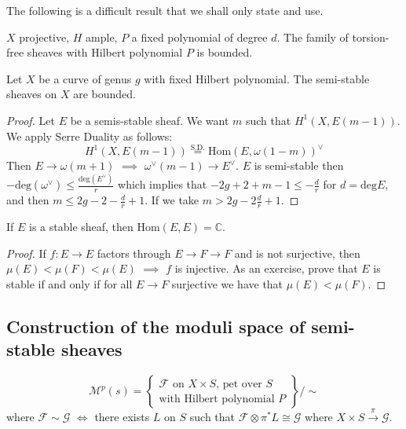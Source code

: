 The following is a difficult result that we shall only state and use.

\begin{theorem}
\label{theorem-}
$X$ projective, $H$ ample, $P$ a fixed polynomial of degree $d$. The family of
torsion-free sheaves with Hilbert polynomial $P$ is bounded.
\end{theorem}

\begin{proposition}
\label{proposition-semi-stable-sheaves-are-bounded-on-curves}
Let $X$ be a curve of genus $g$ with fixed Hilbert polynomial. The semi-stable
sheaves on $X$ are bounded.
\end{proposition}

\begin{proof}
Let $E$ be a semis-stable sheaf. We want $m$ such that $H^{1}(X,E(m-1))$. We
apply Serre Duality as follows:
$$
H^{1}(X,E(m-1))\overset{\text{S.D.}}{=}\text{Hom}(E,\omega(1-m))^\vee
$$Then $E \to \omega(m+1)$ $\implies$ $\omega^\vee(m-1)\to E^\vee$. $E$ is
semi-stable then $-\text{deg}(\omega^\vee)\leq \frac{\text{deg}(E^\vee)}{r}$
which implies that $-2g+2+m-1\leq -\frac{d}{r}$ for $d=\text{deg}E$, and then
$m\leq  2g-2-\frac{d}{r}+1$. If we take $m>2g-2\frac{d}{r}+1$.
\end{proof}

\begin{proposition}
\label{proposition-}
If  $E$ is a stable sheaf, then $\text{Hom}(E,E)=\mathbb{C}$.
\end{proposition}

\begin{proof}
If $f:E \to E$ factors through $E \to F \to F$ and is not surjective, then
$\mu(E)<\mu(F)<\mu(E)$ $\implies$ $f$ is injective. As an exercise, prove that
$E$ is stable if and only if for all $E \to F$ surjective we have that
$\mu(E)<\mu(F)$.
\end{proof}

\subsection*{Construction of the moduli space of semi-stable sheaves}
\label{subsection-construction-of-the-moduli-space-of-semi-stable-sheaves}
$$
\mathcal{M}^p(s)=\left\{ \substack{\text{$\mathcal{F}$ on $X\times S$,
pet over $S$}
 \\ \text{with Hilbert polynomial $P$}} \right\} \Big/\sim
$$
where $\mathcal{F}\sim \mathcal{G}$ $\iff$ there exists $L$ on $S$ such that
$\mathcal{F}\otimes \pi^*L \cong \mathcal{G}$ where 
$X \times S\xrightarrow{\pi}\mathcal{G}$.


